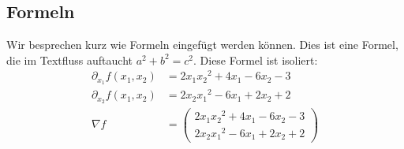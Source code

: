\subsection{Formeln}
    Wir besprechen kurz wie Formeln eingefügt werden können.
    Dies ist eine Formel, die im Textfluss auftaucht $a^{2} + b^{2} = c^{2}$.
    Diese Formel ist isoliert:
    \begin{align*}
            \partial_{x_1} f(x_1,x_2) &= 2x_1{x_2}^2 + 4x_1 - 6x_2 - 3\\
            \partial_{x_2} f(x_1,x_2) &= 2 x_2 {x_1}^2 - 6x_1 + 2x_2 + 2\\
            \nabla f &= \begin{pmatrix}
                2x_1{x_2}^2 + 4x_1 - 6x_2 - 3\\
                2 x_2 {x_1}^2 - 6x_1 + 2x_2 + 2
            \end{pmatrix}
    \end{align*}